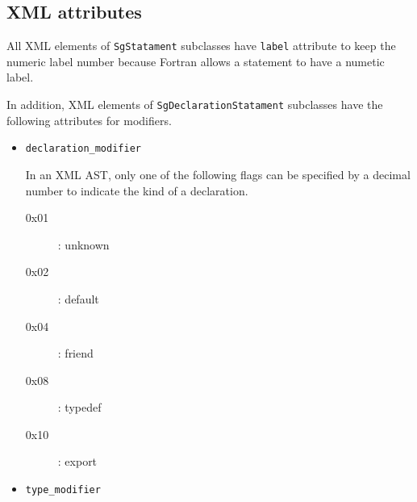 \subsection{XML attributes}\label{sec:stmtatt}
All XML elements of \texttt{SgStatament} subclasses have \texttt{label}
attribute to keep the numeric label number because Fortran allows a
statement to have a numetic label.

In addition, XML elements of \texttt{SgDeclarationStatament} subclasses
have the following attributes for modifiers.
\begin{itemize}
 \item \texttt{declaration\_modifier}

       In an XML AST, only one of the following flags can be specified
       by a decimal number to indicate the kind of a declaration.
       \begin{description}
	\item[0x01]: unknown
	\item[0x02]: default
	\item[0x04]: friend
	\item[0x08]: typedef
	\item[0x10]: export
       \end{description}
 \item \texttt{type\_modifier}


\end{itemize}
